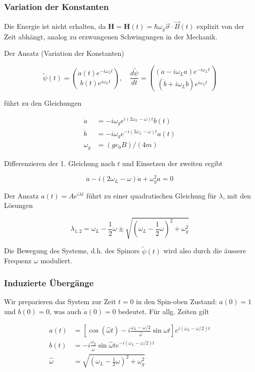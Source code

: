 \documentclass[10pt, letterpaper]{article}
\begin{document}
\subsubsection*{Variation der Konstanten}
Die Energie ist nicht erhalten, da $\mathbf{H}=\mathbf{H}(t)=\hbar \omega_{g} \vec{\sigma} \cdot \vec{B}(t)$ explizit von der Zeit abhängt, analog zu erzwungenen Schwingungen in der Mechanik.

Der Ansatz (Variation der Konstanten)

$$
\tilde{\psi}(t)=\binom{a(t) e^{-i \omega_{L} t}}{b(t) e^{i \omega_{L} t}}, \quad \frac{d \tilde{\psi}}{d t}=\binom{\left(\dot{a}-i \omega_{L} a\right) e^{-i \omega_{L} t}}{\left(\dot{b}+i \omega_{L} b\right) e^{i \omega_{L} t}}
$$

führt zu den Gleichungen

$$
\begin{aligned}
\dot{a} & =-i \omega_{g} e^{i\left(2 \omega_{L}-\omega\right) t} b(t) \\
\dot{b} & =-i \omega_{g} e^{-i\left(2 \omega_{L}-\omega\right) t} a(t) \\
\omega_{g} & =\left(g e_{0} B\right) /(4 m)
\end{aligned}
$$

Differenzieren der 1. Gleichung nach $t$ und Einsetzen der zweiten ergibt

$$
\ddot{a}-i\left(2 \omega_{L}-\omega\right) \dot{a}+\omega_{g}^{2} a=0
$$

Der Ansatz $a(t)=A e^{i \lambda t}$ führt zu einer quadratischen Gleichung für $\lambda$, mit den Lösungen

$$
\lambda_{1,2}=\omega_{L}-\frac{1}{2} \omega \pm \sqrt{\left(\omega_{L}-\frac{1}{2} \omega\right)^{2}+\omega_{g}^{2}}
$$

Die Bewegung des Systems, d.h. des Spinors $\tilde{\psi}(t)$ wird also durch die äussere Frequenz $\omega$ moduliert.

\subsubsection*{Induzierte Übergänge}
Wir preparieren das System zur Zeit $t=0$ in den Spin-oben Zustand: $a(0)=1$ und $b(0)=0$, was auch $\dot{a}(0)=0$ bedeutet. Für allg. Zeiten gilt

$$
\begin{aligned}
a(t) & =\left[\cos (\widehat{\omega} t)-i \frac{\omega_{L}-\omega / 2}{\widehat{\omega}} \sin \widehat{\omega} t\right] e^{i\left(\omega_{L}-\omega / 2\right) t} \\
b(t) & =-i \frac{\omega_{g}}{\widehat{\omega}} \sin \widehat{\omega} t e^{-i\left(\omega_{L}-\omega / 2\right) t} \\
\widehat{\omega} & =\sqrt{\left(\omega_{L}-\frac{1}{2} \omega\right)^{2}+\omega_{g}^{2}}
\end{aligned}
$$
\end{document}
